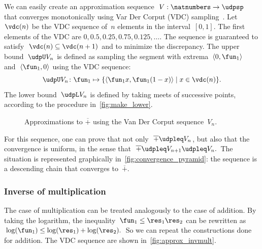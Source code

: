 We can easily create an approximation sequence~$V:\natnumbers\to\udpsp$
that converges monotonically using Var Der Corput (VDC) sampling~\cite[Section 5.2]{LaValle2006Planning}.
Let~$\vdc(n)$ be the VDC sequence of~$n$ elements in the interval~$[0,1]$.
The first elements of the VDC are $0,0.5,0.25,0.75,0.125,\dots$.
The sequence is guaranteed to satisfy~$\vdc(n)\subseteq\vdc(n+1)$
and to minimize the discrepancy. The upper bound~$\udpU V_{n}$
is defined as sampling the segment with extrema~$\left\langle 0,\fun_{1}\right\rangle $
and~$\left\langle \fun_{1},0\right\rangle $ using the VDC sequence:
\[
    \udpU V_{n}\colon\fun_{1}\mapsto\{\left\langle \fun_{1}x,\fun_{1}(1-x)\right\rangle \mid x\in\vdc(n)\}.
\]
The lower bound~$\udpL V_{n}$ is defined by taking meets of successive
points, according to the procedure in~\cref{fig:make_lower}.
\begin{center}
    \begin{figure}[h]
        \begin{centering}
            \par
        \end{centering}
        \caption{\label{fig:Vn}Approximations to $\overline{+}$ using the Van Der
        Corput sequence~$V_{n}$.}
    \end{figure}
    \par
\end{center}

For this sequence, one can prove that not only~$\overline{+}\udpleq V_{n}$,
but also that the convergence is uniform, in the sense that~$\overline{+}\udpleq V_{n+1}\udpleq V_{n}.$
The situation is represented graphically in~\cref{fig:convergence_pyramid}:
the sequence is a descending chain that converges to~$\overline{+}$.

\subsubsection{Inverse of multiplication}

The case of multiplication can be treated analogously to the case
of addition. By taking the logarithm, the inequality~$\fun_{1}\leq\res_{1}\res_{2}$
can be rewritten as~$\log(\fun_{1})\leq\log(\res_{1})+\log(\res_{2}).$
So we can repeat the constructions done for addition. The VDC sequence
are shown in~\cref{fig:approx_invmult}.

